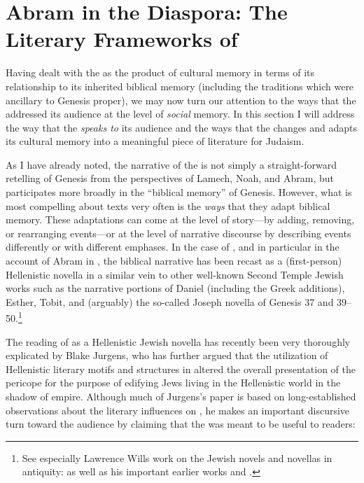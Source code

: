 
\section{Abram in the Diaspora: The Literary Frameworks of \GA}

Having dealt with the \ga as the product of cultural memory in terms of its relationship to its inherited biblical memory %
(including the traditions which were ancillary to Genesis proper), we may now turn our attention to the ways that the \ga addressed its audience at the level of \emph{social} memory. In this section I will address the way that the \ga \emph{speaks to} its audience %
and the ways that the \ga changes and adapts its cultural memory into a meaningful piece of literature for \secondtemple Judaism.

As I have already noted, the narrative of the \ga is not simply a straight-forward retelling of Genesis from the perspectives of Lamech, Noah, and Abram, but participates more broadly in the ``biblical memory'' of Genesis. %
However, what is most compelling about \rwb texts very often is the \emph{ways} that they adapt biblical memory. These adaptations can come at the level of story---by adding, removing, or rearranging events---or at the level of narrative discourse by describing events differently or with different emphases. In the case of \ga, and in particular in the account of Abram in , %
the biblical narrative has been recast as a (first-person) Hellenistic novella in a similar vein to other well-known Second Temple Jewish works such as the narrative portions of Daniel (including the Greek additions), Esther, Tobit, and (arguably) the so-called Joseph novella of Genesis 37 and 39--50.\footnote{See especially Lawrence Wills work on the Jewish novels and novellas in antiquity: \cite*{wills2002} as well as his important earlier works \cite*{wills1995} and \cite{wills1990}.}

The reading of \ga {} as a Hellenistic Jewish novella has recently been very thoroughly explicated by Blake Jurgens, who has further argued that the utilization of Hellenistic literary motifs and structures in \ga altered the overall presentation of the pericope for the purpose of edifying Jews living in the Hellenistic world in the shadow of empire.\autocite{jurgens_jsj2018} Although much of Jurgens's paper is based on long-established observations about the literary influences on \ga, he makes an important discursive turn toward the audience by claiming that the \ga was meant to be useful to readers:

